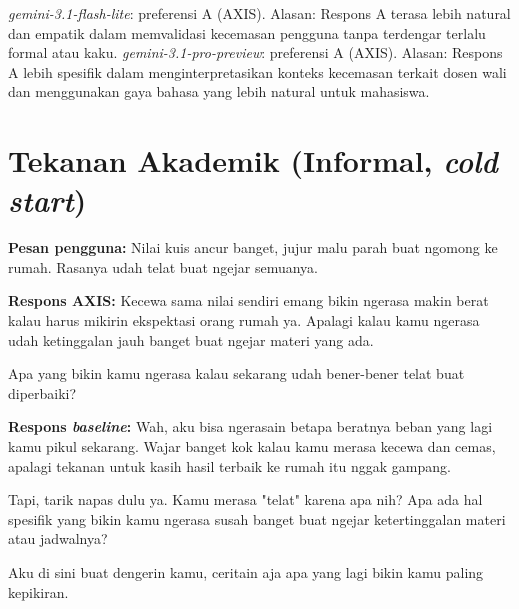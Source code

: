 \textit{gemini-3.1-flash-lite}: preferensi A (AXIS). Alasan: Respons A terasa lebih natural dan empatik dalam memvalidasi kecemasan pengguna tanpa terdengar terlalu formal atau kaku.\newline
\textit{gemini-3.1-pro-preview}: preferensi A (AXIS). Alasan: Respons A lebih spesifik dalam menginterpretasikan konteks kecemasan terkait dosen wali dan menggunakan gaya bahasa yang lebih natural untuk mahasiswa.\newline

\section{Tekanan Akademik (Informal, \textit{cold start})}

\textbf{Pesan pengguna:} Nilai kuis ancur banget, jujur malu parah buat ngomong ke rumah. Rasanya udah telat buat ngejar semuanya.

\textbf{Respons AXIS:} Kecewa sama nilai sendiri emang bikin ngerasa makin berat kalau harus mikirin ekspektasi orang rumah ya. Apalagi kalau kamu ngerasa udah ketinggalan jauh banget buat ngejar materi yang ada.

Apa yang bikin kamu ngerasa kalau sekarang udah bener-bener telat buat diperbaiki?

\textbf{Respons \textit{baseline}:} Wah, aku bisa ngerasain betapa beratnya beban yang lagi kamu pikul sekarang. Wajar banget kok kalau kamu merasa kecewa dan cemas, apalagi tekanan untuk kasih hasil terbaik ke rumah itu nggak gampang.

Tapi, tarik napas dulu ya. Kamu merasa "telat" karena apa nih? Apa ada hal spesifik yang bikin kamu ngerasa susah banget buat ngejar ketertinggalan materi atau jadwalnya? 

Aku di sini buat dengerin kamu, ceritain aja apa yang lagi bikin kamu paling kepikiran.

